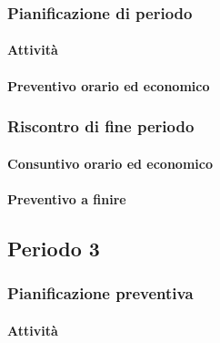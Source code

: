 \smallPreventivoTable{
	
}

\subsubsection{Pianificazione di periodo}


\paragraph{Attività}

\planningTable{
	
}


\paragraph{Preventivo orario ed economico}



\subsubsection{Riscontro di fine periodo}


\paragraph{Consuntivo orario ed economico}


\paragraph{Preventivo a finire}

\pafTable{
	
}




\subsection{Periodo 3}

\subsubsection{Pianificazione preventiva}

\paragraph{Attività}

